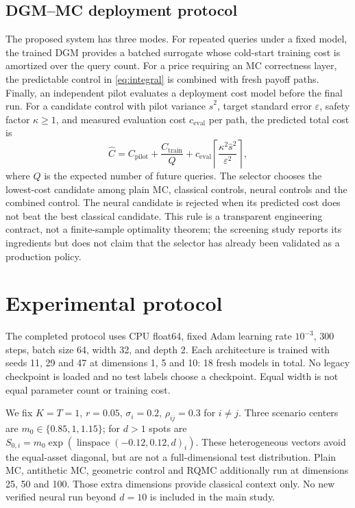 \documentclass[10pt]{article}
\begin{document}
\subsection{DGM--MC deployment protocol}
\label{sec:deployment}
The proposed system has three modes. For repeated queries under a fixed model,
the trained DGM provides a batched surrogate whose cold-start training cost is
amortized over the query count. For a price requiring an MC correctness layer,
the predictable control in \eqref{eq:integral} is combined with fresh payoff
paths. Finally, an independent pilot evaluates a deployment cost model before
the final run. For a candidate control with pilot variance $\widehat{s}^2$,
target standard error $\varepsilon$, safety factor $\kappa\geq1$, and measured
evaluation cost $c_{\mathrm{eval}}$ per path, the predicted total cost is
\begin{equation}
 \widehat{C}=C_{\mathrm{pilot}}+
 \frac{C_{\mathrm{train}}}{Q}+
 c_{\mathrm{eval}}\left\lceil\frac{\kappa^2\widehat{s}^2}{\varepsilon^2}\right\rceil,
\end{equation}
where $Q$ is the expected number of future queries. The selector chooses the
lowest-cost candidate among plain MC, classical controls, neural controls and
the combined control. The neural candidate is rejected when its predicted cost
does not beat the best classical candidate. This rule is a transparent
engineering contract, not a finite-sample optimality theorem; the screening
study reports its ingredients but does not claim that the selector has already
been validated as a production policy.

\section{Experimental protocol}
\label{sec:protocol}
The completed protocol uses CPU float64, fixed Adam learning rate $10^{-3}$,
300 steps, batch size 64, width 32, and depth 2. Each architecture is trained
with seeds 11, 29 and 47 at dimensions 1, 5 and 10: 18 fresh models in total.
No legacy checkpoint is loaded and no test labels choose a checkpoint.
Equal width is not equal parameter count or training cost.

We fix $K=T=1$, $r=0.05$, $\sigma_i=0.2$, $\rho_{ij}=0.3$ for $i\ne j$.
Three scenario centers are $m_0\in\{0.85,1,1.15\}$; for $d>1$ spots are
$S_{0,i}=m_0\exp(\operatorname{linspace}(-0.12,0.12,d)_i)$.
These heterogeneous vectors avoid the equal-asset diagonal, but are not a
full-dimensional test distribution. Plain MC, antithetic MC, geometric control
and RQMC additionally run at dimensions 25, 50 and 100. Those extra dimensions
provide classical context only. No new verified neural run beyond $d=10$ is
included in the main study.
\end{document}

